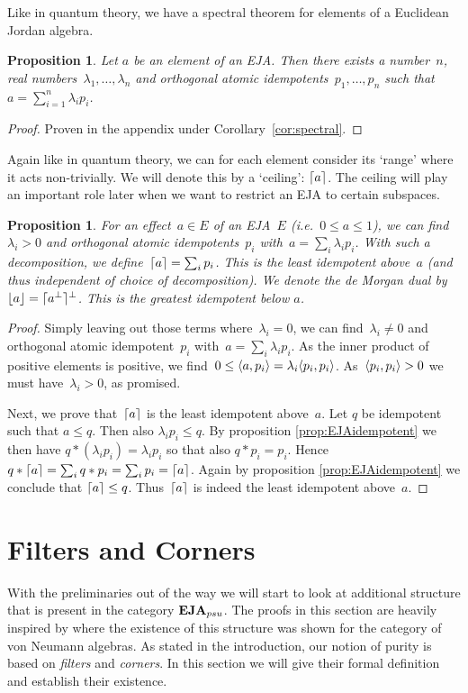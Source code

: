 \documentclass[submission,copyright,creativecommons]{eptcs}
\newcounter{main}
\newtheorem{proposition}[main]{Proposition}
\theoremstyle{definition}
\DeclarePairedDelimiter{\ceil}{\lceil}{\rceil}
\DeclarePairedDelimiter{\floor}{\lfloor}{\rfloor}
\DeclarePairedDelimiter{\inn}{\langle}{\rangle}
\newcommand{\EJA}{\text{\textbf{EJA}}\xspace}
\begin{document}
Like in quantum theory, we have a spectral theorem for elements of
a Euclidean Jordan algebra.
\begin{proposition}
    Let $a$ be an element of an EJA. Then there exists a number~$n$,
    real numbers~$\lambda_1, \ldots, \lambda_n$
    and orthogonal atomic
    idempotents~$p_1, \ldots, p_n$
    such that $a = \sum_{i=1}^n \lambda_i p_i$.
\end{proposition}
\begin{proof}
    Proven in the appendix under Corollary~\ref{cor:spectral}.
\end{proof}

Again like in quantum theory, we can for each element consider its `range'
where it acts non-trivially. We will denote this by a `ceiling': $\ceil{a}$.
The ceiling will play an important role later when we want to restrict an
EJA to certain subspaces.

\begin{proposition}\label{prop:EJAceilfloor}
    For an effect~$a \in E$ of an EJA~$E$ (i.e.~$0 \leq a \leq 1$),
    we can find~$\lambda_i>0$ and orthogonal atomic idempotents~$p_i$
    with~$a=\sum_i\lambda_i p_i$.
With such a decomposition,
    we define~$\ceil{a}=\sum_i p_i$.
This is the least idempotent above~$a$
        (and thus independent of choice of decomposition).
We denote the de Morgan dual by~$\floor{a}=\ceil{a^\perp}^\perp$.
    This is the greatest idempotent below $a$.
\end{proposition}
\begin{proof}
Simply leaving out those terms where~$\lambda_i=0$,
    we can find~$\lambda_i\neq 0$ and orthogonal atomic idempotent~$p_i$
    with~$a = \sum_i \lambda_i p_i$.
As the inner product of positive elements is positive,
    we find~$0 \leq \inn{a , p_i} = \lambda_i \inn{p_i,p_i}$.
    As~$\inn{p_i,p_i} > 0$ we must have~$\lambda_i > 0$, as promised.

Next, we prove that~$\ceil{a}$ is the least idempotent above~$a$.
	Let $q$ be idempotent such that $a\leq q$. Then also
	$\lambda_i p_i\leq q$. By proposition \ref{prop:EJAidempotent}
	we then have $q*(\lambda_i p_i) = \lambda_i p_i$ so that
	also $q*p_i=p_i$.
    Hence~$q * \ceil{a} = \sum_i q* p_i = \sum_i p_i = \ceil{a}$.
    Again by proposition \ref{prop:EJAidempotent}
    we conclude that $\ceil{a} \leq q$.
    Thus~$\ceil{a}$ is indeed the least idempotent above~$a$.
\end{proof}

\section{Filters and Corners}\label{sec:filtercorner}
With the preliminaries out of the way we will start to look at additional structure that is present in the category $\EJA_{psu}$. The proofs in this section are heavily inspired by \cite{westerbaan2016universal,bramthesis} where the existence of this structure was shown for the category of von Neumann algebras. As stated in the introduction, our notion of purity is based on \emph{filters} and \emph{corners}. In this section we will give their formal definition and establish their existence.
\end{document}
